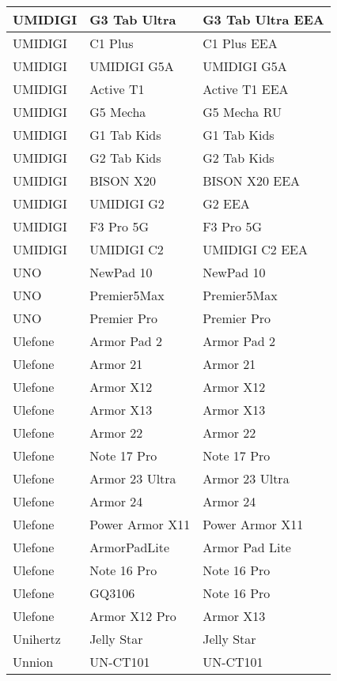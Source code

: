 \begin{tabularx}{\linewidth}{|l|X|X|}
        UMIDIGI & G3 Tab Ultra & G3 Tab Ultra EEA \\ \hline
        UMIDIGI & C1 Plus & C1 Plus EEA \\ \hline
        UMIDIGI & UMIDIGI G5A & UMIDIGI G5A \\ \hline
        UMIDIGI & Active T1 & Active T1 EEA \\ \hline
        UMIDIGI & G5 Mecha & G5 Mecha RU \\ \hline
        UMIDIGI & G1 Tab Kids & G1 Tab Kids \\ \hline
        UMIDIGI & G2 Tab Kids & G2 Tab Kids \\ \hline
        UMIDIGI & BISON X20 & BISON X20 EEA \\ \hline
        UMIDIGI & UMIDIGI G2 & G2 EEA \\ \hline
        UMIDIGI & F3 Pro 5G & F3 Pro 5G \\ \hline
        UMIDIGI & UMIDIGI C2 & UMIDIGI C2 EEA \\ \hline
        UNO & NewPad 10 & NewPad 10 \\ \hline
        UNO & Premier5Max & Premier5Max \\ \hline
        UNO & Premier Pro & Premier Pro \\ \hline
        Ulefone & Armor Pad 2 & Armor Pad 2 \\ \hline
        Ulefone & Armor 21 & Armor 21 \\ \hline
        Ulefone & Armor X12 & Armor X12 \\ \hline
        Ulefone & Armor X13 & Armor X13 \\ \hline
        Ulefone & Armor 22 & Armor 22 \\ \hline
        Ulefone & Note 17 Pro & Note 17 Pro \\ \hline
        Ulefone & Armor 23 Ultra & Armor 23 Ultra \\ \hline
        Ulefone & Armor 24 & Armor 24 \\ \hline
        Ulefone & Power Armor X11 & Power Armor X11 \\ \hline
        Ulefone & ArmorPadLite & Armor Pad Lite \\ \hline
        Ulefone & Note 16 Pro & Note 16 Pro \\ \hline
        Ulefone & GQ3106 & Note 16 Pro \\ \hline
        Ulefone & Armor X12 Pro & Armor X13 \\ \hline
        Unihertz & Jelly Star & Jelly Star \\ \hline
        Unnion & UN-CT101 & UN-CT101 \\ \hline

\end{tabularx}
